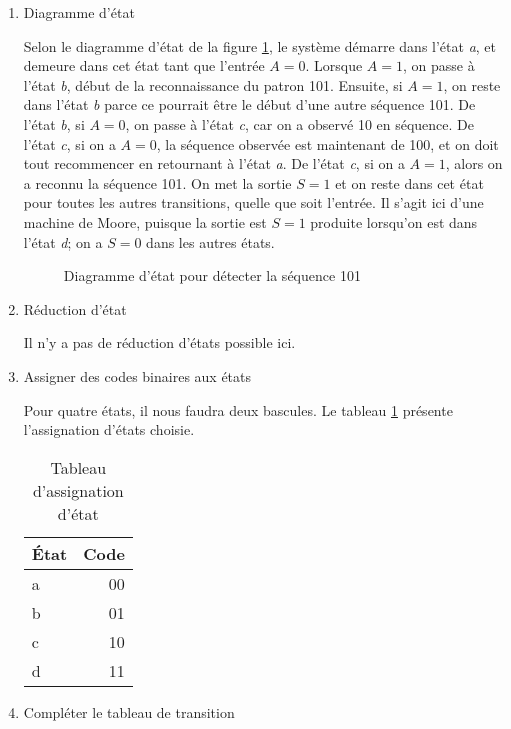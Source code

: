 \documentclass[11pt]{article}
\begin{document}
\begin{enumerate}
\item Diagramme d'état
\label{sec:org4b4c116}

Selon le diagramme d'état de la figure \ref{fig:orgd0a20ab}, le
système démarre dans l'état \emph{a}, et demeure dans cet état tant que
l'entrée \(A=0\). Lorsque \(A=1\), on passe à l'état \emph{b}, début de la
reconnaissance du patron 101. Ensuite, si \(A=1\), on reste dans
l'état \emph{b} parce ce pourrait être le début d'une autre
séquence 101. De l'état \emph{b}, si \(A=0\), on passe à l'état \emph{c}, car on
a observé 10 en séquence. De l'état \emph{c}, si on a \(A=0\), la séquence
observée est maintenant de 100, et on doit tout recommencer en
retournant à l'état \emph{a}.  De l'état \emph{c}, si on a \(A=1\), alors on a
reconnu la séquence 101. On met la sortie \(S=1\) et on reste dans cet
état pour toutes les autres transitions, quelle que soit l'entrée. Il
s'agit ici d'une machine de Moore, puisque la sortie est \(S=1\)
produite lorsqu'on est dans l'état \emph{d}; on a \(S=0\) dans les autres
états.

\begin{figure}[htbp]
\centering

\caption{\label{fig:orgd0a20ab}Diagramme d'état pour détecter la séquence 101}
\end{figure}


\item Réduction d'état
\label{sec:orge862b8f}

Il n'y a pas de réduction d'états possible ici.

\item Assigner des codes binaires aux états
\label{sec:orgba42c3d}

Pour quatre états, il nous faudra deux bascules.  Le tableau
   \ref{tab:orgde2384b} présente l'assignation d'états choisie.

\begin{table}[htbp]
\caption{\label{tab:orgde2384b}Tableau d'assignation d'état}
\centering
\begin{tabular}{lr}
État & Code\\
\hline
a & 00\\
b & 01\\
c & 10\\
d & 11\\
\end{tabular}
\end{table}


\item Compléter le tableau de transition
\label{sec:org5ab8e72}


\end{enumerate}
\end{document}
